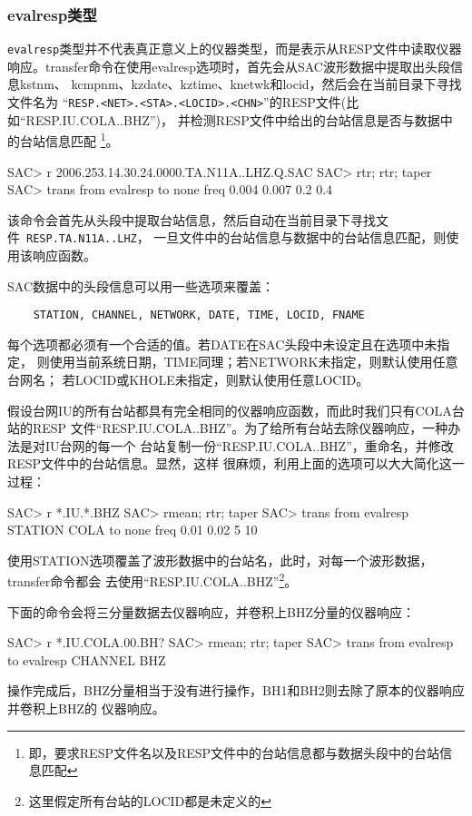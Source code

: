 \subsubsection{evalresp类型}
\verb+evalresp+类型并不代表真正意义上的仪器类型，而是表示从RESP文件中读取仪器
响应。transfer命令在使用evalresp选项时，首先会从SAC波形数据中提取出头段信息kstnm、
kcmpnm、kzdate、kztime、knetwk和locid，然后会在当前目录下寻找文件名为
``\verb+RESP.<NET>.<STA>.<LOCID>.<CHN>+''的RESP文件(比如``RESP.IU.COLA..BHZ'')，
并检测RESP文件中给出的台站信息是否与数据中的台站信息匹配
\footnote{即，要求RESP文件名以及RESP文件中的台站信息都与数据头段中的台站信息匹配}。
\begin{SACCode}
SAC> r 2006.253.14.30.24.0000.TA.N11A..LHZ.Q.SAC
SAC> rtr; rtr; taper
SAC> trans from evalresp to none freq 0.004 0.007 0.2 0.4
\end{SACCode}
该命令会首先从头段中提取台站信息，然后自动在当前目录下寻找文件~\verb+RESP.TA.N11A..LHZ+，
一旦文件中的台站信息与数据中的台站信息匹配，则使用该响应函数。

SAC数据中的头段信息可以用一些选项来覆盖：
\begin{verbatim}
    STATION, CHANNEL, NETWORK, DATE, TIME, LOCID, FNAME
\end{verbatim}
每个选项都必须有一个合适的值。若DATE在SAC头段中未设定且在选项中未指定，
则使用当前系统日期，TIME同理；若NETWORK未指定，则默认使用任意台网名；
若LOCID或KHOLE未指定，则默认使用任意LOCID。

假设台网IU的所有台站都具有完全相同的仪器响应函数，而此时我们只有COLA台站的RESP
文件``RESP.IU.COLA..BHZ''。为了给所有台站去除仪器响应，一种办法是对IU台网的每一个
台站复制一份``RESP.IU.COLA..BHZ''，重命名，并修改RESP文件中的台站信息。显然，这样
很麻烦，利用上面的选项可以大大简化这一过程：
\begin{SACCode}
SAC> r *.IU.*.BHZ
SAC> rmean; rtr; taper
SAC> trans from evalresp STATION COLA to none freq 0.01 0.02 5 10
\end{SACCode}
使用STATION选项覆盖了波形数据中的台站名，此时，对每一个波形数据，transfer命令都会
去使用``RESP.IU.COLA..BHZ''\footnote{这里假定所有台站的LOCID都是未定义的}。

下面的命令会将三分量数据去仪器响应，并卷积上BHZ分量的仪器响应：
\begin{SACCode}
SAC> r *.IU.COLA.00.BH?
SAC> rmean; rtr; taper
SAC> trans from evalresp to evalresp CHANNEL BHZ
\end{SACCode}
操作完成后，BHZ分量相当于没有进行操作，BH1和BH2则去除了原本的仪器响应并卷积上BHZ的
仪器响应。

